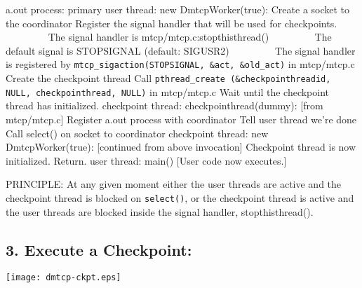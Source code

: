 \documentclass{article}
\begin{document}
\begin{algorithmic}[1]
\STATE a.out process:
\STATE {\ \ } primary user thread:
\STATE {\ \ \ \ } new DmtcpWorker(true):
\STATE {\ \ \ \ \ \ } Create a socket to the coordinator
\STATE {\ \ \ \ \ \ } Register the signal handler that will be
	used for checkpoints. \newline
\hbox{\ \ \ \ \ \ \ \ } The signal handler is
		 mtcp/mtcp.c:stopthisthread()\newline
\hbox{\ \ \ \ \ \ \ \ } The default signal is STOPSIGNAL
		 (default: SIGUSR2)\newline
\hbox{\ \ \ \ \ \ \ \ } The signal handler is registered by
	 {\tt mtcp\_sigaction(STOPSIGNAL, \&act, \&old\_act)} in mtcp/mtcp.c
\STATE {\ \ \ \ \ \ } Create the checkpoint thread
\STATE {\ \ \ \ \ \ } Call
	{\tt pthread\_create (\&checkpointhreadid, NULL, checkpointhread, NULL)}
	in mtcp/mtcp.c
\STATE {\ \ \ \ \ \ } Wait until the checkpoint thread has initialized.
\newline
\STATE {\ \ } checkpoint thread:
\STATE {\ \ \ \ } checkpointhread(dummy):  [from mtcp/mtcp.c]
\STATE {\ \ \ \ \ \ } Register a.out process with coordinator
\STATE {\ \ \ \ \ \ } Tell user thread we're done
\STATE {\ \ \ \ \ \ } Call select() on socket to coordinator
\newline
\STATE {\ \ } checkpoint thread:
\STATE {\ \ \ \ } new DmtcpWorker(true):  [continued from above invocation]
\STATE {\ \ \ \ \ \ } Checkpoint thread is now initialized.  Return.
\newline
\STATE {\ \ } user thread:
\STATE {\ \ \ \ } main()  [User code now executes.]
\end{algorithmic}

\bigskip
\noindent
PRINCIPLE:  At any given moment either the user threads are active and
	the checkpoint thread is blocked on {\tt select()}, or
	the checkpoint thread is active and the user threads are
	blocked inside the signal handler, stopthisthread().




\newpage

\subsection*{3. Execute a Checkpoint:}

\begin{center}
\texttt{[image: dmtcp-ckpt.eps]}
\end{center}
\end{document}

